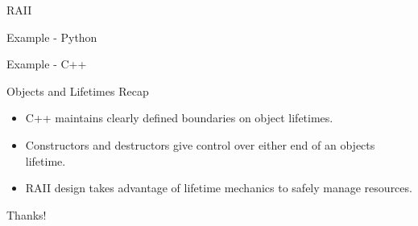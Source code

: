\documentclass{beamer}
\begin{document}
	
	
	\begin{frame}{RAII}
		\begin{exampleblock}{Example - Python}
			\lstI
		\end{exampleblock}
		\begin{exampleblock}{Example - C++}
			\lstII
		\end{exampleblock}
	\end{frame}
	
	\begin{frame}{Objects and Lifetimes Recap}
		\begin{itemize}
			\item C++ maintains clearly defined boundaries on object lifetimes.
			\medskip
			\item Constructors and destructors give control over either end of an objects lifetime.
			\medskip
			\item RAII design takes advantage of lifetime mechanics to safely manage resources.
		\end{itemize}
	\end{frame}
	
	\begin{frame}
		\begin{center}
			\huge Thanks!
		\end{center}
	\end{frame}
\end{document}
